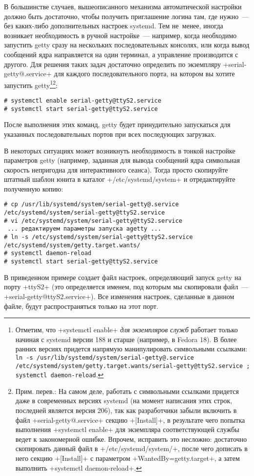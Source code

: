 \documentclass[10pt,oneside,a4paper]{article}
\begin{document}
В большинстве случаев, вышеописанного механизма автоматической настройки должно
быть достаточно, чтобы получить приглашение логина там, где нужно~--- без
каких-либо дополнительных настроек systemd. Тем не~менее, иногда возникает
необходимость в ручной настройке~--- например, когда необходимо запустить getty
сразу на нескольких последовательных консолях, или когда вывод сообщений ядра
направляется на один терминал, а управление производится с другого. Для решения
таких задач достаточно определить по экземпляру +serial-getty@.service+ для
каждого последовательного порта, на котором вы хотите запустить
getty\footnote{Отметим, что +systemctl enable+ \emph{для экземпляров служб}
работает только начиная с systemd версии 188 и старше (например, в Fedora 18). В
более ранних версиях придется напрямую манипулировать символьными ссылками:
\texttt{ln -s /usr/lib/systemd/system/serial-getty@.service
/etc/systemd/system/getty.target.wants/serial-getty@ttyS2.service ; systemctl
daemon-reload}.}\footnote{\label{ftn:enableserial}Прим. перев.: На самом деле,
работать с символьными ссылками придется даже в современных версиях systemd (на
момент написания этих строк, последней является версия 206), так как
разработчики забыли включить в файл +serial-getty@.service+ секцию +[Install]+,
в результате чего попытка выполнения +systemctl enable+ для экземпляра
соответствующей службы ведет к закономерной ошибке. Впрочем, исправить это
несложно: достаточно скопировать данный файл в +/etc/systemd/system/+, после
чего дописать в него секцию +[Install]+ с параметром +WantedBy=getty.target+, а
затем выполнить +systemctl daemon-reload+.}:
\begin{Verbatim}
# systemctl enable serial-getty@ttyS2.service
# systemctl start serial-getty@ttyS2.service
\end{Verbatim}
После выполнения этих команд, getty будет принудительно запускаться для
указанных последовательных портов при всех последующих загрузках.

В некоторых ситуациях может возникнуть необходимость в тонкой настройке
параметров getty (например, заданная для вывода сообщений ядра символьная
скорость непригодна для интерактивного сеанса). Тогда просто скопируйте штатный
шаблон юнита в каталог +/etc/systemd/system+ и отредактируйте полученную копию:
\begin{Verbatim}
# cp /usr/lib/systemd/system/serial-getty@.service /etc/systemd/system/serial-getty@ttyS2.service
# vi /etc/systemd/system/serial-getty@ttyS2.service
 ... редактируем параметры запуска agetty ...
# ln -s /etc/systemd/system/serial-getty@ttyS2.service /etc/systemd/system/getty.target.wants/
# systemctl daemon-reload
# systemctl start serial-getty@ttyS2.service
\end{Verbatim}
В приведенном примере создает файл настроек, определяющий запуск getty на порту
+ttyS2+ (это определяется именем, под которым мы скопировали файл~---
+serial-getty@ttyS2.service+). Все изменения настроек, сделанные в данном файле,
будут распространяться только на этот порт.
\end{document}
